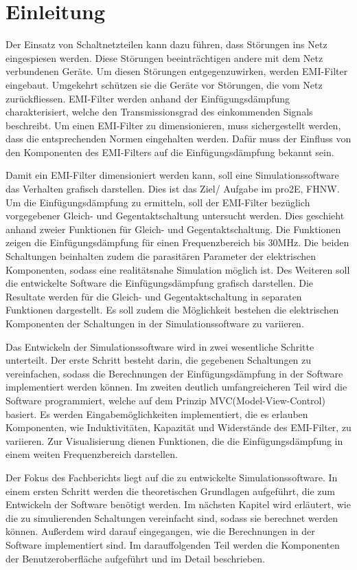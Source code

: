 \section{Einleitung} \label{sec:einleitung}
Der Einsatz von Schaltnetzteilen kann dazu führen, dass Störungen ins Netz eingespiesen werden. Diese Störungen beeinträchtigen andere mit dem Netz verbundenen Geräte. Um diesen Störungen entgegenzuwirken, werden EMI-Filter eingebaut. Umgekehrt schützen sie die Geräte vor Störungen, die vom Netz zurückfliessen. EMI-Filter werden anhand der Einfügungsdämpfung charakterisiert, welche den Transmissionsgrad des einkommenden Signals beschreibt. Um einen EMI-Filter zu dimensionieren, muss sichergestellt werden, dass die entsprechenden Normen eingehalten werden. Dafür muss der Einfluss von den Komponenten des EMI-Filters auf die Einfügungsdämpfung bekannt sein. 

Damit ein EMI-Filter dimensioniert werden kann, soll eine Simulationssoftware das Verhalten grafisch darstellen. Dies ist das Ziel/ Aufgabe im pro2E, FHNW. Um die Einfügungsdämpfung zu ermitteln, soll der EMI-Filter bezüglich vorgegebener Gleich- und Gegentaktschaltung untersucht werden. Dies geschieht anhand zweier Funktionen für Gleich- und Gegentaktschaltung. Die Funktionen zeigen die Einfügungsdämpfung für einen Frequenzbereich bis 30MHz. Die beiden Schaltungen beinhalten zudem die parasitären Parameter der elektrischen Komponenten, sodass eine realitätsnahe Simulation möglich ist. Des Weiteren soll die entwickelte Software die Einfügungsdämpfung grafisch darstellen. Die Resultate werden für die Gleich- und Gegentaktschaltung in separaten Funktionen dargestellt. Es soll zudem die Möglichkeit bestehen die elektrischen Komponenten der Schaltungen in der Simulationssoftware zu variieren.

Das Entwickeln der Simulationssoftware wird in zwei wesentliche Schritte unterteilt. Der erste Schritt besteht darin, die gegebenen Schaltungen zu vereinfachen, sodass die Berechnungen der Einfügungsdämpfung in der Software implementiert werden können. Im zweiten deutlich umfangreicheren Teil wird die Software programmiert, welche auf dem Prinzip MVC(Model-View-Control) basiert. Es werden Eingabemöglichkeiten implementiert, die es erlauben Komponenten, wie Induktivitäten, Kapazität und Widerstände des EMI-Filter, zu variieren. Zur Visualisierung dienen Funktionen, die die Einfügungsdämpfung in einem weiten Frequenzbereich darstellen.

Der Fokus des Fachberichts liegt auf die zu entwickelte Simulationssoftware. In einem ersten Schritt werden die theoretischen Grundlagen aufgeführt, die zum Entwickeln der Software benötigt werden. Im nächsten Kapitel wird erläutert, wie die zu simulierenden Schaltungen vereinfacht sind, sodass sie berechnet werden können. Außerdem wird darauf eingegangen, wie die Berechnungen in der Software implementiert sind. Im darauffolgenden Teil werden die Komponenten der Benutzeroberfläche aufgeführt und im Detail beschrieben.

